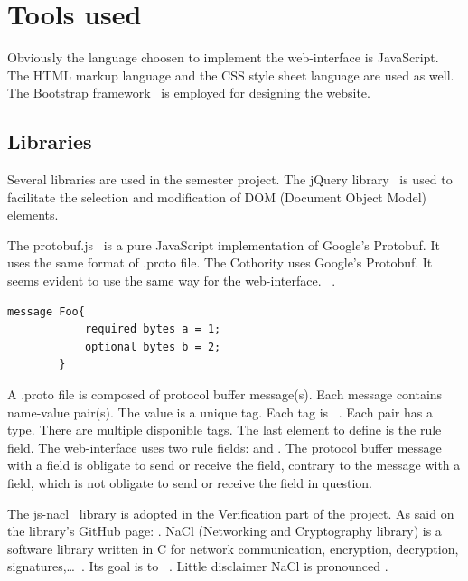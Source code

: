 \documentclass[11pt, a4paper, twoside, openright, openany]{article} %
\begin{document}
\section{Tools used}
Obviously the language choosen to implement the web-interface is JavaScript.
The HTML markup language and the CSS style sheet language are used as well.
\newline
The Bootstrap framework~\cite{bootstrap} is employed for designing the website.
\bigbreak

\subsection{Libraries}
Several libraries are used in the semester project.
\newline
The jQuery library~\cite{query} is used to
facilitate the selection and modification of DOM (Document Object Model) elements.
\bigbreak

The protobuf.js~\cite{protobufjs} is a pure JavaScript implementation of Google's Protobuf.
It uses the same format of .proto file.
The Cothority uses Google's Protobuf.
It seems evident to use the same way for the web-interface.
\newline
{}~\cite{protobufDefi}.
\bigbreak

\begin{lstlisting}[caption={Example of .proto file}, captionpos=b]
 message Foo{
            required bytes a = 1;
            optional bytes b = 2;
        }
\end{lstlisting}

A .proto file is composed of protocol buffer message(s). Each message contains name-value pair(s).
The value is a unique tag. Each tag is ~\cite{protobufDefi}.
Each pair has a type. There are multiple disponible tags.
\newline
The last element to define is the rule field. The web-interface
uses two rule fields:  and . The protocol buffer message
with a  field is obligate to send or receive the field, contrary to
the message with a  field, which is not obligate to send or receive the field in question.
\bigbreak

The js-nacl~\cite{jsnacl} library is adopted in the Verification part of the project.
As said on the library's GitHub page: .
NaCl (Networking and Cryptography library) is a software library written in C for
network communication, encryption, decryption, signatures,\ldots~\cite{nacl}. Its
goal is to ~\cite{nacl}.
Little disclaimer NaCl is pronounced .
\bigbreak
\end{document}

